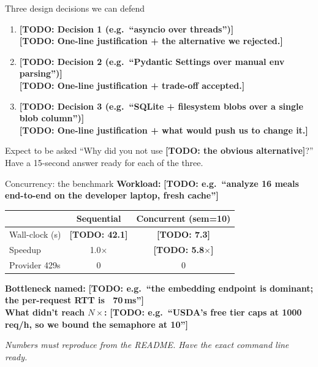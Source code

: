 \documentclass[aspectratio=169,11pt]{beamer}
\newcommand{\TODO}[1]{\textcolor{accent2}{\textbf{[TODO: #1]}}}
\begin{document}
\begin{frame}{Three design decisions we can defend}
  \begin{enumerate}\setlength\itemsep{0.6em}
    \item \textbf{\TODO{Decision 1 (e.g.\ ``asyncio over threads'')}}\\
      \TODO{One-line justification + the alternative we rejected.}
    \item \textbf{\TODO{Decision 2 (e.g.\ ``Pydantic Settings over manual env parsing'')}}\\
      \TODO{One-line justification + trade-off accepted.}
    \item \textbf{\TODO{Decision 3 (e.g.\ ``SQLite + filesystem blobs over a single blob column'')}}\\
      \TODO{One-line justification + what would push us to change it.}
  \end{enumerate}

  \vspace{0.6em}
  \begin{block}{Expect to be asked}
    ``Why did you not use \TODO{the obvious alternative}?'' Have a 15-second answer ready for each of the three.
  \end{block}
\end{frame}

\begin{frame}{Concurrency: the benchmark}
  \textbf{Workload:} \TODO{e.g.\ ``analyze 16 meals end-to-end on the developer laptop, fresh cache''}

  \vspace{0.4em}
  \begin{center}\small
  \begin{tabular}{lcc}
    \toprule
    & \textbf{Sequential} & \textbf{Concurrent (sem=10)} \\
    \midrule
    Wall-clock (s) & \TODO{42.1} & \TODO{7.3} \\
    Speedup        & 1.0$\times$ & \TODO{5.8$\times$} \\
    Provider 429s  & 0  & 0 \\
    \bottomrule
  \end{tabular}
  \end{center}

  \vspace{0.4em}
  \textbf{Bottleneck named:} \TODO{e.g.\ ``the embedding endpoint is dominant; the per-request RTT is ~70\,ms''}\\
  \textbf{What didn't reach $N\times$:} \TODO{e.g.\ ``USDA's free tier caps at 1000 req/h, so we bound the semaphore at 10''}

  \vspace{0.3em}
  {\footnotesize\textit{Numbers must reproduce from the README. Have the exact command line ready.}}
\end{frame}
\end{document}
